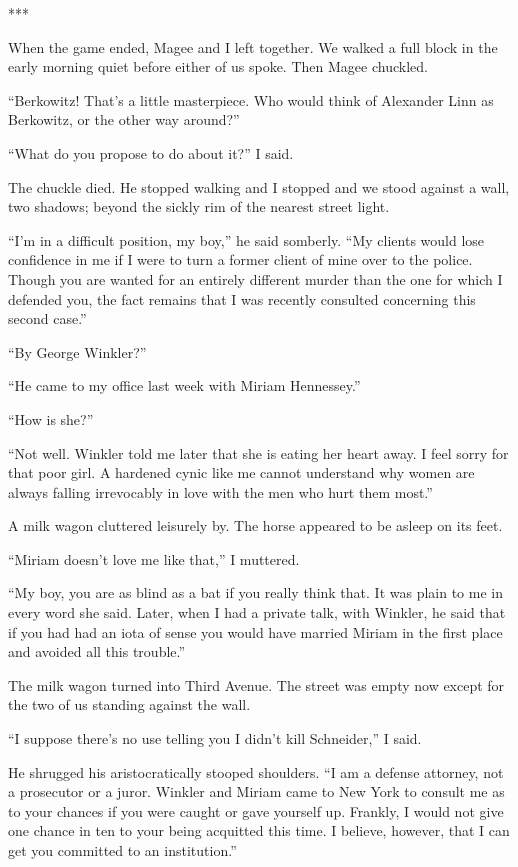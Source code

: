 \documentclass{novel}
\begin{document}
{***

When the game ended, Magee and I left together. We walked a full block in the early morning quiet before either of us spoke. Then Magee chuckled.

“Berkowitz! That’s a little masterpiece. Who would think of Alexander Linn as Berkowitz, or the other way around?”

“What do you propose to do about it?” I said.

The chuckle died. He stopped walking and I stopped and we stood against a wall, two shadows; beyond the sickly rim of the nearest street light.

“I’m in a difficult position, my boy,” he said somberly. “My clients would lose confidence in me if I were to turn a former client of mine over to the police. Though you are wanted for an entirely different murder than the one for which I defended you, the fact remains that I was recently consulted concerning this second case.”

“By George Winkler?”

“He came to my office last week with Miriam Hennessey.”

“How is she?”

“Not well. Winkler told me later that she is eating her heart away. I feel sorry for that poor girl. A hardened cynic like me cannot understand why women are always falling irrevocably in love with the men who hurt them most.”

A milk wagon cluttered leisurely by. The horse appeared to be asleep on its feet.

“Miriam doesn’t love me like that,” I muttered.

“My boy, you are as blind as a bat if you really think that. It was plain to me in every word she said. Later, when I had a private talk, with Winkler, he said that if you had had an iota of sense you would have married Miriam in the first place and avoided all this trouble.”

The milk wagon turned into Third Avenue. The street was empty now except for the two of us standing against the wall.

“I suppose there’s no use telling you I didn’t kill Schneider,” I said.

He shrugged his aristocratically stooped shoulders. “I am a defense attorney, not a prosecutor or a juror. Winkler and Miriam came to New York to consult me as to your chances if you were caught or gave yourself up. Frankly, I would not give one chance in ten to your being acquitted this time. I believe, however, that I can get you committed to an institution.”

}
\end{document}
